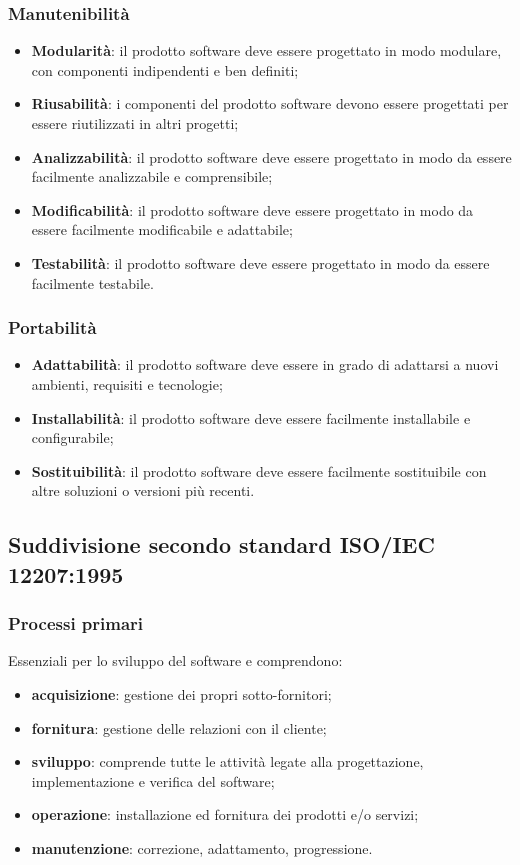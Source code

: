 \subsubsection{Manutenibilità}
\begin{itemize}
    \item \textbf{Modularità}: il prodotto software deve essere progettato in modo modulare, con componenti indipendenti e ben definiti;
    \item \textbf{Riusabilità}: i componenti del prodotto software devono essere progettati per essere riutilizzati in altri progetti;
    \item \textbf{Analizzabilità}: il prodotto software deve essere progettato in modo da essere facilmente analizzabile e comprensibile;
    \item \textbf{Modificabilità}: il prodotto software deve essere progettato in modo da essere facilmente modificabile e adattabile;
    \item \textbf{Testabilità}: il prodotto software deve essere progettato in modo da essere facilmente testabile.
\end{itemize}
\subsubsection{Portabilità}
\begin{itemize}
    \item \textbf{Adattabilità}: il prodotto software deve essere in grado di adattarsi a nuovi ambienti, requisiti e tecnologie;
    \item \textbf{Installabilità}: il prodotto software deve essere facilmente installabile e configurabile;
    \item \textbf{Sostituibilità}: il prodotto software deve essere facilmente sostituibile con altre soluzioni o versioni più recenti.
\end{itemize}
\newpage
\subsection{Suddivisione secondo standard ISO/IEC 12207:1995}
\subsubsection{Processi primari}
Essenziali per lo sviluppo del software e comprendono:
\begin{itemize}
    \item \textbf{acquisizione}: gestione dei propri sotto-fornitori;
    \item \textbf{fornitura}: gestione delle relazioni con il cliente;
    \item \textbf{sviluppo}: comprende tutte le attività legate alla progettazione, implementazione e verifica del software;
    \item \textbf{operazione}: installazione ed fornitura dei prodotti e/o servizi;
    \item \textbf{manutenzione}: correzione, adattamento, progressione.
\end{itemize}
